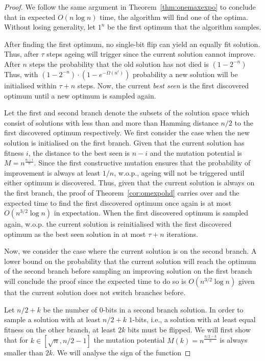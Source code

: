\documentclass[lettersize,journal]{IEEEtran}
\begin{document}
\begin{proof}
	We follow the same argument in Theorem~\ref{thm:onemaxexpo} to conclude that in expected $O(n\log n)$ time, the algorithm will find one of the optima. {\color{blue} Without losing generality, let $1^n$ be the first optimum that the algorithm samples}. 
	
	After finding the first optimum, no single-bit flip can yield an equally fit solution. {\color{blue}Thus, after $\tau$ steps ageing will trigger since the current solution cannot improve. After $n$ steps the probability that the old solution has not died is $\left(1-2^{-n}\right)$ }  Thus, with 
	$\left(1-2^{-n}\right) \cdot \left(1-e^{-\Omega(n^\epsilon)} \right)$ probability a new solution will be initialised within $\tau + n$ steps. Now, the current \emph{best seen} is the first discovered optimum until a new optimum is sampled again. 
	
	Let the first and second branch denote the subsets of the solution space which consist of solutions with less than and more than Hamming distance $n/2$ to the first discovered optimum respectively. We first consider the case when the new solution is initialised on the first branch. Given that the current solution has fitness $i$, the distance to the best seen is $n-i$ and the mutation potential is $M=n^{\frac{n-i}{n}}$. Since the first constructive mutation ensures that the probability of improvement is always at least $1/n$, w.o.p.,  ageing will not be triggered until either optimum is discovered. Thus, given that the current solution is always on the first branch, the proof of Theorem~\ref{cor:omexpohd} carries over and the expected time to find the first discovered optimum once again is at most $O(n^{3/2}\log{n})$ in expectation. When the first discovered optimum is sampled again, w.o.p. the current solution is reinitialised with the first discovered optimum as the best seen solution in at most $\tau + n$ iterations.
	
	Now, we consider the case where the current solution is on the second branch. A lower 
	bound on the probability that the current solution will reach the optimum of the second branch before 
	sampling an improving solution on the first branch will conclude the proof since the expected time to do so is $O(n^{3/2}\log{n})$ given that the current solution does not switch branches before. 
	
	{\color{blue}Let $n/2 + k$ be the number of $0$-bits in a second branch solution. In order to sample a solution with at least $n/2 +k$ $1$-bits, i.e., a solution with at least equal fitness on the other branch, at least $2k$ bits must be flipped. We will first show that for $k \in [ \sqrt{n},n/2-1]$ the mutation potential $M(k)=n^\frac{n/2 -k}{n}$ is always smaller than $2k$. We will analyse the sign of the function 
	
}
\end{proof}
\end{document}
